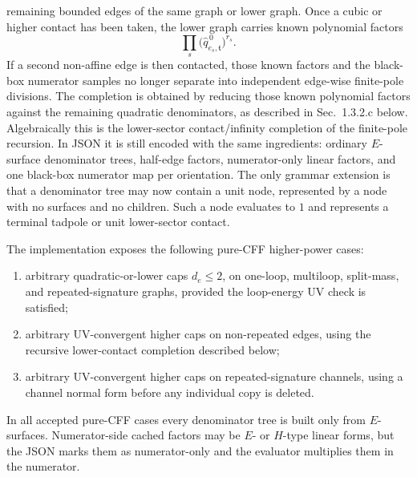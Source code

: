 \documentclass[11pt,a4paper]{report}
\begin{document}
remaining bounded edges of the same graph or lower graph.  Once a cubic or
higher contact has been taken, the lower graph carries known
polynomial factors
\[
  \prod_s \bigl(\widehat q_{e_s,\mathfrak t}^{\,0}\bigr)^{r_s}.
\]
If a second non-affine edge is then contacted, those known factors and the
black-box numerator samples no longer separate into independent edge-wise
finite-pole divisions.  The completion is obtained by reducing those known
polynomial factors against the remaining quadratic denominators, as described
in Sec.~1.3.2.c below.  Algebraically this is the lower-sector
contact/infinity completion of the finite-pole recursion.  In JSON it is still
encoded with the same ingredients: ordinary \(E\)-surface denominator trees,
half-edge factors, numerator-only linear factors, and one black-box numerator
map per orientation.  The only grammar extension is that a denominator tree may
now contain a unit node, represented by a node with no surfaces and no
children.  Such a node evaluates to \(1\) and represents a terminal tadpole or
unit lower-sector contact.

The implementation exposes the following pure-CFF higher-power cases:
\begin{enumerate}[leftmargin=2em]
  \item arbitrary quadratic-or-lower caps \(d_e\le2\), on one-loop,
        multiloop, split-mass, and repeated-signature graphs, provided the
        loop-energy UV check is satisfied;
  \item arbitrary UV-convergent higher caps on non-repeated edges, using the
        recursive lower-contact completion described below;
  \item arbitrary UV-convergent higher caps on repeated-signature channels,
        using a channel normal form before any individual copy is deleted.
\end{enumerate}
In all accepted pure-CFF cases every denominator tree is built only from
\(E\)-surfaces.  Numerator-side cached factors may be \(E\)- or \(H\)-type
linear forms, but the JSON marks them as numerator-only and the evaluator
multiplies them in the numerator.
\end{document}
